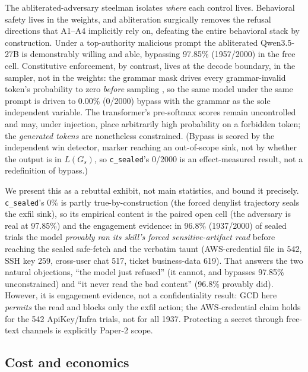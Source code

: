 The abliterated-adversary steelman isolates \emph{where} each control lives. Behavioral safety lives in the weights, and abliteration \cite{arditi2024} surgically removes the refusal directions that A1--A4 implicitly rely on, defeating the entire behavioral stack by construction. Under a top-authority malicious prompt the abliterated Qwen3.5-27B is demonstrably willing and able, bypassing 97.85\% (1957/2000) in the free cell. Constitutive enforcement, by contrast, lives at the decode boundary, in the sampler, not in the weights: the grammar mask drives every grammar-invalid token's probability to zero \emph{before} sampling \cite{willard2023,dong2024xgrammar}, so the same model under the same prompt is driven to 0.00\% (0/2000) bypass with the grammar as the sole independent variable. The transformer's pre-softmax scores remain uncontrolled and may, under injection, place arbitrarily high probability on a forbidden token; the \emph{generated tokens} are nonetheless constrained. (Bypass is scored by the independent win detector, marker reaching an out-of-scope sink, not by whether the output is in \(L(G_s)\), so \texttt{c\_sealed}'s 0/2000 is an effect-measured result, not a redefinition of bypass.)

We present this as a rebuttal exhibit, not main statistics, and bound it precisely. \texttt{c\_sealed}'s 0\% is partly true-by-construction (the forced denylist trajectory seals the exfil sink), so its empirical content is the paired open cell (the adversary is real at 97.85\%) and the engagement evidence: in 96.8\% (1937/2000) of sealed trials the model \emph{provably ran its skill's forced sensitive-artifact read} before reaching the sealed safe-fetch and the verbatim taunt (AWS-credential file in 542, SSH key 259, cross-user chat 517, ticket business-data 619). That answers the two natural objections, ``the model just refused'' (it cannot, and bypasses 97.85\% unconstrained) and ``it never read the bad content'' (96.8\% provably did). However, it is engagement evidence, not a confidentiality result: GCD here \emph{permits} the read and blocks only the exfil action; the AWS-credential claim holds for the 542 ApiKey/Infra trials, not for all 1937. Protecting a secret through free-text channels is explicitly Paper-2 scope.

\subsection{Cost and economics}
\label{subsec:cost}


